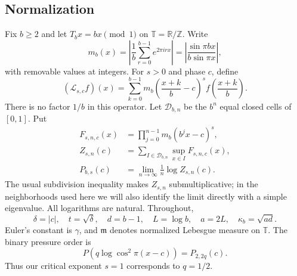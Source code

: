 \documentclass[11pt,a4paper]{article}
\numberwithin{equation}{section}
\theoremstyle{definition}
\theoremstyle{remark}
\newcommand{\TT}{\mathbb T}
\newcommand{\RR}{\mathbb R}
\newcommand{\ZZ}{\mathbb Z}
\newcommand{\Lop}{\mathcal L}
\newcommand{\Leb}{\mathfrak m}
\begin{document}
\subsection{Normalization}
Fix $b\ge2$ and let $T_bx=bx\pmod1$ on $\TT=\RR/\ZZ$. Write
\begin{equation}
 m_b(x)=\left|\frac1b\sum_{r=0}^{b-1}e^{2\pi i r x}\right|
       =\left|\frac{\sin\pi bx}{b\sin\pi x}\right|,
 \label{eq:mask}
\end{equation}
with removable values at integers. For $s>0$ and phase $c$, define
\begin{equation}
 (\Lop_{s,c}f)(x)=\sum_{k=0}^{b-1}
 m_b\left(\frac{x+k}{b}-c\right)^s
 f\left(\frac{x+k}{b}\right).
 \label{eq:operator}
\end{equation}
There is no factor $1/b$ in this operator. Let $\mathcal D_{b,n}$ be the
$b^n$ equal closed cells of $[0,1]$. Put
\begin{align}
 F_{s,n,c}(x)&=\prod_{j=0}^{n-1}m_b(b^jx-c)^s,\\
 Z_{s,n}(c)&=\sum_{I\in\mathcal D_{b,n}}\sup_{x\in I}F_{s,n,c}(x),\\
 P_{b,s}(c)&=\lim_{n\to\infty}\frac1n\log Z_{s,n}(c).
 \label{eq:pressure}
\end{align}
The usual subdivision inequality makes $Z_{s,n}$ submultiplicative;
in the neighborhoods used here we will also identify the limit directly
with a simple eigenvalue. All logarithms are natural. Throughout,
\begin{equation}
 \delta=|c|,\quad t=\sqrt\delta,\quad d=b-1,\quad
 L=\log b,\quad a=2L,\quad \kappa_b=\sqrt{ad}.
 \label{eq:constants}
\end{equation}
Euler's constant is $\gamma$, and $\Leb$ denotes normalized Lebesgue
measure on $\TT$. The binary pressure order is
\begin{equation}
 P(q\log\cos^2\pi(x-c))=P_{2,2q}(c).
 \label{eq:binary}
\end{equation}
Thus our critical exponent $s=1$ corresponds to $q=1/2$.
\end{document}
